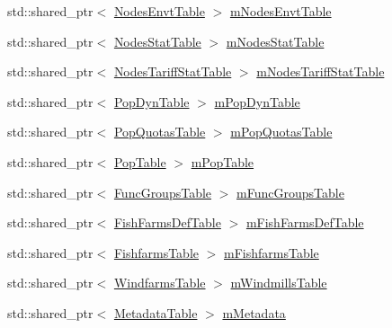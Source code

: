 \begin{DoxyCompactItemize}
\item 
std\+::shared\+\_\+ptr$<$ \mbox{\hyperlink{class_nodes_envt_table}{Nodes\+Envt\+Table}} $>$ \mbox{\hyperlink{struct_s_q_lite_output_storage_1_1_impl_a28bf945a4d4e90f297062c46ec7185b7}{m\+Nodes\+Envt\+Table}}
\item 
std\+::shared\+\_\+ptr$<$ \mbox{\hyperlink{class_nodes_stat_table}{Nodes\+Stat\+Table}} $>$ \mbox{\hyperlink{struct_s_q_lite_output_storage_1_1_impl_ae338fa5074833a4a06681f9500d6ba0c}{m\+Nodes\+Stat\+Table}}
\item 
std\+::shared\+\_\+ptr$<$ \mbox{\hyperlink{class_nodes_tariff_stat_table}{Nodes\+Tariff\+Stat\+Table}} $>$ \mbox{\hyperlink{struct_s_q_lite_output_storage_1_1_impl_a1045eccbb1c5e7cac589c4fae05de940}{m\+Nodes\+Tariff\+Stat\+Table}}
\item 
std\+::shared\+\_\+ptr$<$ \mbox{\hyperlink{class_pop_dyn_table}{Pop\+Dyn\+Table}} $>$ \mbox{\hyperlink{struct_s_q_lite_output_storage_1_1_impl_a1d9fbc5c56043db00dcf2e212aeafee4}{m\+Pop\+Dyn\+Table}}
\item 
std\+::shared\+\_\+ptr$<$ \mbox{\hyperlink{class_pop_quotas_table}{Pop\+Quotas\+Table}} $>$ \mbox{\hyperlink{struct_s_q_lite_output_storage_1_1_impl_a9e9adedf1df163a1cb068bf07873be47}{m\+Pop\+Quotas\+Table}}
\item 
std\+::shared\+\_\+ptr$<$ \mbox{\hyperlink{class_pop_table}{Pop\+Table}} $>$ \mbox{\hyperlink{struct_s_q_lite_output_storage_1_1_impl_ab7405a6fd5ef547b31dcef9e5b982e3b}{m\+Pop\+Table}}
\item 
std\+::shared\+\_\+ptr$<$ \mbox{\hyperlink{class_func_groups_table}{Func\+Groups\+Table}} $>$ \mbox{\hyperlink{struct_s_q_lite_output_storage_1_1_impl_ace828391a9f532b99dd6c6a05a7a30bc}{m\+Func\+Groups\+Table}}
\item 
std\+::shared\+\_\+ptr$<$ \mbox{\hyperlink{class_fish_farms_def_table}{Fish\+Farms\+Def\+Table}} $>$ \mbox{\hyperlink{struct_s_q_lite_output_storage_1_1_impl_a54daac0990ebaa6c368a7988963a1d83}{m\+Fish\+Farms\+Def\+Table}}
\item 
std\+::shared\+\_\+ptr$<$ \mbox{\hyperlink{class_fishfarms_table}{Fishfarms\+Table}} $>$ \mbox{\hyperlink{struct_s_q_lite_output_storage_1_1_impl_a220e63214b82333035bc9f57c88e5d39}{m\+Fishfarms\+Table}}
\item 
std\+::shared\+\_\+ptr$<$ \mbox{\hyperlink{class_windfarms_table}{Windfarms\+Table}} $>$ \mbox{\hyperlink{struct_s_q_lite_output_storage_1_1_impl_a6dc456befff721970ef68651aca1cd20}{m\+Windmills\+Table}}
\item 
std\+::shared\+\_\+ptr$<$ \mbox{\hyperlink{class_metadata_table}{Metadata\+Table}} $>$ \mbox{\hyperlink{struct_s_q_lite_output_storage_1_1_impl_a17bbe0053c0659446aa1ef65c1161d54}{m\+Metadata}}
\end{DoxyCompactItemize}


